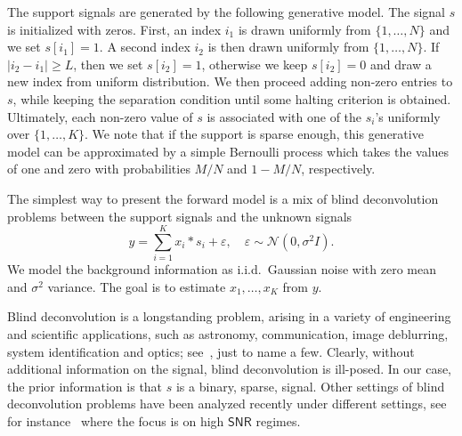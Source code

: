 \documentclass[english,11pt]{article}
\numberwithin{equation}{section}
\theoremstyle{plain}
\theoremstyle{definition}
\theoremstyle{remark}
\theoremstyle{plain}
\theoremstyle{remark}
\theoremstyle{plain}
\theoremstyle{plain}
\newcommand{\SNR}{{\textsf{SNR}}}
\begin{document}
The support signals are generated by the following generative model. The signal $s$ is initialized with zeros.
First, an index $i_1$ is drawn uniformly from $\{1,\ldots,N\}$ and we set $s[i_1]=1$. A second index $i_2$ is then drawn uniformly from $\{1,\ldots,N\}$. If $\vert i_2-i_1\vert \geq L$,
then we set $s[i_2]=1$, otherwise we keep $s[i_2]=0$ and draw a new index  from uniform distribution. We then proceed adding  non-zero entries to $s$,  while keeping the separation condition until some halting criterion is obtained. Ultimately, each  non-zero value of $s$ is associated with one of the $s_i$'s uniformly over  $\{1,\ldots,K\}$. We note that if the support is sparse enough, this generative model can be approximated by a simple Bernoulli process which takes the values of one and zero with probabilities  $M/N$ and $1-M/N$, respectively.

The simplest way to present the forward model is a mix of blind deconvolution problems between the support signals and the unknown signals
\begin{equation}
y = \sum_{i=1}^K x_i\ast s_i + \varepsilon,\quad \varepsilon\sim\mathcal{N}(0,\sigma^2 I).
\end{equation}
We model the background information as i.i.d.\ Gaussian noise with zero mean and $\sigma^2$ variance. 
The goal is to estimate $x_1,\ldots,x_K$ from $y$.

Blind deconvolution is a longstanding problem, arising in a variety of engineering and scientific applications, such as astronomy, communication, image deblurring, system identification and optics; see~\cite{jefferies1993restoration,shalvi1990new,ayers1988iterative,abed1997blind}, just to name a few. Clearly, without additional information on the signal, blind deconvolution is ill-posed. In our case, the prior information is that $s$ is a binary, sparse, signal. 
Other settings of blind deconvolution problems have been analyzed recently under different settings, see for instance~\cite{ahmed2014blind,li2016identifiability,li2016rapid,ling2015self,ling2017blind,chi2016guaranteed}
where the focus is on high $\SNR$ regimes.
\end{document}
